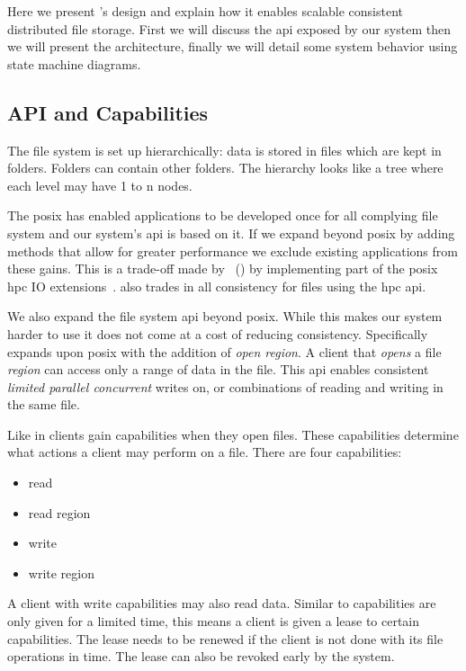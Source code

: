 Here we present \name{}'s design and explain how it enables scalable consistent distributed file storage. First we will discuss the \ac{api} exposed by our system then we will present the architecture, finally we will detail some system behavior using state machine diagrams. 
%
\subsection{API and Capabilities}
The file system is set up hierarchically: data is stored in files which are kept in folders. Folders can contain other folders. The hierarchy looks like a tree where each level may have 1 to n nodes.

The \ac{posix} has enabled applications to be developed once for all complying file system and our system's \ac{api} is based on it. If we expand beyond \ac{posix} by adding methods that allow for greater performance we exclude existing applications from these gains. This is a trade-off made by \ceph{}~() by implementing part of the \ac{posix} \ac{hpc} IO extensions~\cite{hpc_posix}. \ceph{} also trades in all consistency for files using the \ac{hpc} \ac{api}. 

We also expand the file system \ac{api} beyond \ac{posix}. While this makes our system harder to use it does not come at a cost of reducing consistency. Specifically \name{} expands upon \ac{posix} with the addition of \textsl{open region}. A client that \textit{opens} a file \textit{region} can access only a range of data in the file. This \ac{api} enables consistent \emph{limited parallel concurrent} writes on, or combinations of reading and writing in the same file.

Like \ceph{} in \name{} clients gain capabilities when they open files. These capabilities determine what actions a client may perform on a file. There are four capabilities: \nopagebreak
%
\begin{multicols}{4} %
\begin{itemize}
	\item read
	\item read region
	\item write
	\item write region
\end{itemize}
\end{multicols}
%
A client with write capabilities may also read data. Similar to \ceph{} capabilities are only given for a limited time, this means a client is given a lease to certain capabilities. The lease needs to be renewed if the client is not done with its file operations in time. The lease can also be revoked early by the system.

